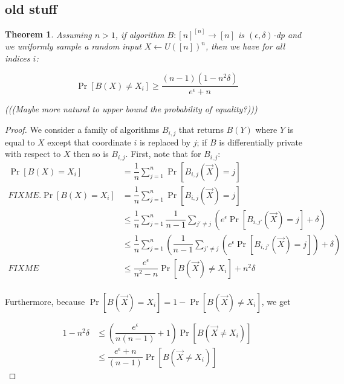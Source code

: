 \documentclass{article}
\newtheorem{theorem}{Theorem}[section]
\begin{document}
\subsection{old stuff}
\newpage
{\color{gray}

\begin{theorem}\label{th:lower}
Assuming $n>1$, if algorithm $B:[n]^{[n]} \rightarrow [n]$ is  $(\epsilon, \delta)$-dp and we uniformly sample a random input $X\leftarrow U\left([n]\right)^{n}$, then we have for all indices $i$:

\[\Pr[B(X) \neq X_i] \geq   \dfrac{(n-1)(1-n^2\delta)}{e^\epsilon + n}\]

(((Maybe more natural to upper bound the probability of equality?)))
\end{theorem}

\begin{proof}
We consider a family of algorithms $B_{i,j}$ that returns $B(Y)$ where $Y$ is equal to $X$ except that coordinate $i$ is replaced by $j$; if $B$ is differentially private with respect to $X$ then so is $B_{i,j}$.
First, note that for $B_{i, j}$: 
\begin{align*}
\Pr[B(X) = X_i]  &= \dfrac{1}{n}\sum\limits_{j=1}^{n}\Pr[B_{i,j}(\vec{X}) = j] \\
FIXME. \Pr[B(X) = X_i]  &= \dfrac{1}{n}\sum\limits_{j=1}^{n}\Pr[B_{i,j}(\vec{X}) = j] \\
&\leq \dfrac{1}{n} \sum\limits_{j=1}^{n}  \dfrac{1}{n-1} \sum_{j' \neq j}\left( e^\epsilon \Pr[B_{i, j'}(\vec{X}) = j] + \delta\right) \\
&\leq \dfrac{1}{n} \sum\limits_{j=1}^{n} \left( \dfrac{1}{n-1} \sum_{j' \neq j}\left( e^\epsilon \Pr[B_{i, j'}(\vec{X}) = j]\right) + \delta \right)\\
FIXME& \leq  \dfrac{e^\epsilon}{n^2-n} \Pr[B(\vec{X}) \neq X_i] + n^2 \delta\\
\end{align*}

Furthermore, because $\Pr[B(\vec{X}) = X_i] = 1 - \Pr[B(\vec{X}) \neq  X_i]$, we get

\begin{align}
 1-n^2\delta&\leq \left(\dfrac{e^\epsilon}{n(n-1)} + 1\right)\Pr[B(\vec{X}\neq X_i)]\\
&\leq \dfrac{e^\epsilon + n}{(n-1)}\Pr[B(\vec{X}\neq X_i)]
\end{align}


\end{proof}}
\end{document}
